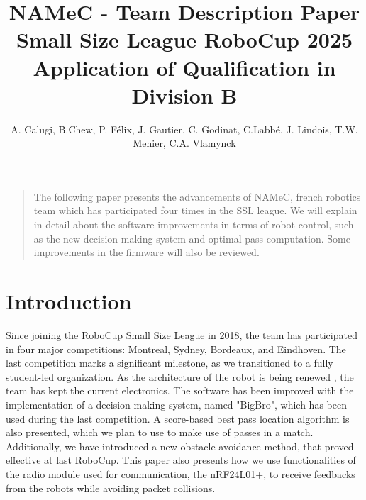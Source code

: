 \title{
  NAMeC - Team Description Paper \\
  Small Size League RoboCup 2025 \\
  Application of Qualification in Division B
}


\author{
    A. Calugi, B.Chew, P. Félix, J. Gautier, C. Godinat,
    C.Labbé, J. Lindois, T.W. Menier, C.A. Vlamynck
}



\maketitle

\renewenvironment{abstract}
{\begin{quote}
\noindent \par{\bfseries \abstractname}}
{\medskip\noindent
\end{quote}
}

\begin{abstract}
The following paper presents the advancements of NAMeC, french robotics team 
which has participated four times in the SSL league. We will explain
in detail about the software improvements in terms of robot control, such as the
new decision-making system and optimal pass computation. Some improvements in the
firmware will also be reviewed.
\end{abstract}


\section{Introduction}

Since joining the RoboCup Small Size League in 2018, the team has participated in four major competitions: Montreal, Sydney, Bordeaux, and Eindhoven.
The last competition marks a significant milestone, as we transitioned to a fully student-led organization.
As the architecture of the robot is being renewed \cite{tdp2023}, the team has kept the current electronics.
The software has been improved with the implementation of a decision-making system, named "BigBro", which has been
used during the last competition. A score-based best pass location algorithm is also presented, which we plan to use
to make use of passes in a match. Additionally, we have introduced a new obstacle avoidance method,
that proved effective at last RoboCup. This paper also presents how we use functionalities of the radio module
used for communication, the nRF24L01+, to receive feedbacks from the robots while avoiding packet collisions.